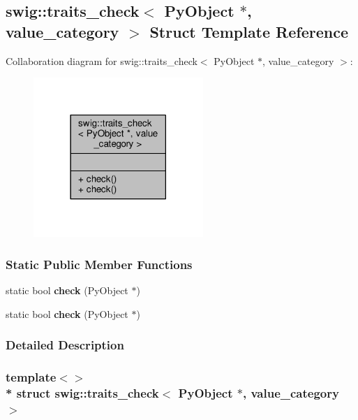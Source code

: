 \subsection{swig\+:\+:traits\+\_\+check$<$ Py\+Object $\ast$, value\+\_\+category $>$ Struct Template Reference}
\label{structswig_1_1traits__check_3_01PyObject_01_5_00_01value__category_01_4}


Collaboration diagram for swig\+:\+:traits\+\_\+check$<$ Py\+Object $\ast$, value\+\_\+category $>$\+:
\nopagebreak
\begin{figure}[H]
\begin{center}
\leavevmode
\includegraphics[width=182pt]{d6/d72/structswig_1_1traits__check_3_01PyObject_01_5_00_01value__category_01_4__coll__graph}
\end{center}
\end{figure}
\subsubsection*{Static Public Member Functions}
\begin{DoxyCompactItemize}
\item 
static bool {\bf check} (Py\+Object $\ast$)
\item 
static bool {\bf check} (Py\+Object $\ast$)
\end{DoxyCompactItemize}


\subsubsection{Detailed Description}
\subsubsection*{template$<$$>$\\*
struct swig\+::traits\+\_\+check$<$ Py\+Object $\ast$, value\+\_\+category $>$}



